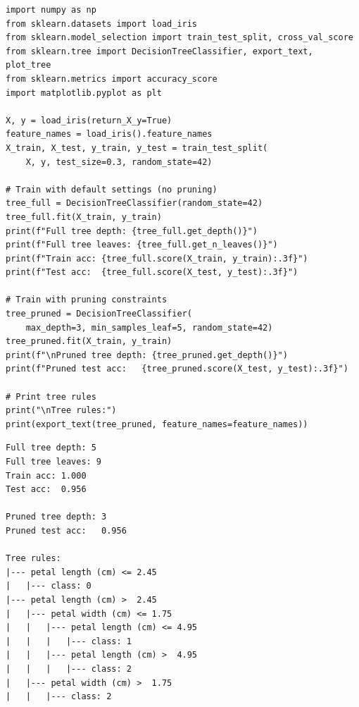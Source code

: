 \begin{codeblock}[title=\textbf{Decision Tree Classification with scikit-learn}]
\begin{verbatim}
import numpy as np
from sklearn.datasets import load_iris
from sklearn.model_selection import train_test_split, cross_val_score
from sklearn.tree import DecisionTreeClassifier, export_text, plot_tree
from sklearn.metrics import accuracy_score
import matplotlib.pyplot as plt

X, y = load_iris(return_X_y=True)
feature_names = load_iris().feature_names
X_train, X_test, y_train, y_test = train_test_split(
    X, y, test_size=0.3, random_state=42)

# Train with default settings (no pruning)
tree_full = DecisionTreeClassifier(random_state=42)
tree_full.fit(X_train, y_train)
print(f"Full tree depth: {tree_full.get_depth()}")
print(f"Full tree leaves: {tree_full.get_n_leaves()}")
print(f"Train acc: {tree_full.score(X_train, y_train):.3f}")
print(f"Test acc:  {tree_full.score(X_test, y_test):.3f}")

# Train with pruning constraints
tree_pruned = DecisionTreeClassifier(
    max_depth=3, min_samples_leaf=5, random_state=42)
tree_pruned.fit(X_train, y_train)
print(f"\nPruned tree depth: {tree_pruned.get_depth()}")
print(f"Pruned test acc:   {tree_pruned.score(X_test, y_test):.3f}")

# Print tree rules
print("\nTree rules:")
print(export_text(tree_pruned, feature_names=feature_names))
\end{verbatim}
\end{codeblock}

\begin{codeoutput}
\begin{verbatim}
Full tree depth: 5
Full tree leaves: 9
Train acc: 1.000
Test acc:  0.956

Pruned tree depth: 3
Pruned test acc:   0.956

Tree rules:
|--- petal length (cm) <= 2.45
|   |--- class: 0
|--- petal length (cm) >  2.45
|   |--- petal width (cm) <= 1.75
|   |   |--- petal length (cm) <= 4.95
|   |   |   |--- class: 1
|   |   |--- petal length (cm) >  4.95
|   |   |   |--- class: 2
|   |--- petal width (cm) >  1.75
|   |   |--- class: 2
\end{verbatim}
\end{codeoutput}

